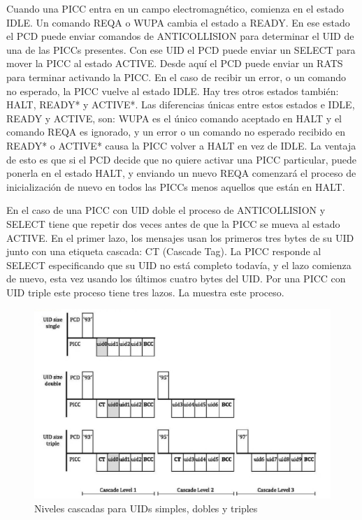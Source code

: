 \documentclass[a4paper, twoside, 11pt]{report}
\begin{document}
\FloatBarrier

Cuando una PICC entra en un campo electromagnético, comienza en el estado IDLE. Un comando REQA o WUPA cambia el estado a READY. En ese estado el PCD puede enviar comandos de ANTICOLLISION para determinar el UID de una de las PICCs presentes. Con ese UID el PCD puede enviar un SELECT para mover la PICC al estado ACTIVE. Desde aquí el PCD puede enviar un RATS para terminar activando la PICC. En el caso de recibir un error, o un comando no esperado, la PICC vuelve al estado IDLE. Hay tres otros estados también: HALT, READY* y ACTIVE*. Las diferencias únicas entre estos estados e IDLE, READY y ACTIVE, son: WUPA es el único comando aceptado en HALT y el comando REQA es ignorado, y un error o un comando no esperado recibido en READY* o ACTIVE* causa la PICC volver a HALT en vez de IDLE. La ventaja de esto es que si el PCD decide que no quiere activar una PICC particular, puede ponerla en el estado HALT, y enviando un nuevo REQA comenzará el proceso de inicialización de nuevo en todos las PICCs menos aquellos que están en HALT.

En el caso de una PICC con UID doble el proceso de ANTICOLLISION y SELECT tiene que repetir dos veces antes de que la PICC se mueva al estado ACTIVE. En el primer lazo, los mensajes usan los primeros tres bytes de su UID junto con una etiqueta cascada: CT (Cascade Tag). La PICC responde al SELECT especificando que su UID no está completo todavía, y el lazo comienza de nuevo, esta vez usando los últimos cuatro bytes del UID. Por una PICC con UID triple este proceso tiene tres lazos. La  muestra este proceso.

\begin{figure}[htb]
  \centering
  \includegraphics[scale=0.75]{./img/cascade_levels}
  \caption{Niveles cascadas para UIDs simples, dobles y triples~\cite{iso14443-3}}
  \label{fig:cascade_levels}
\end{figure}
\end{document}
